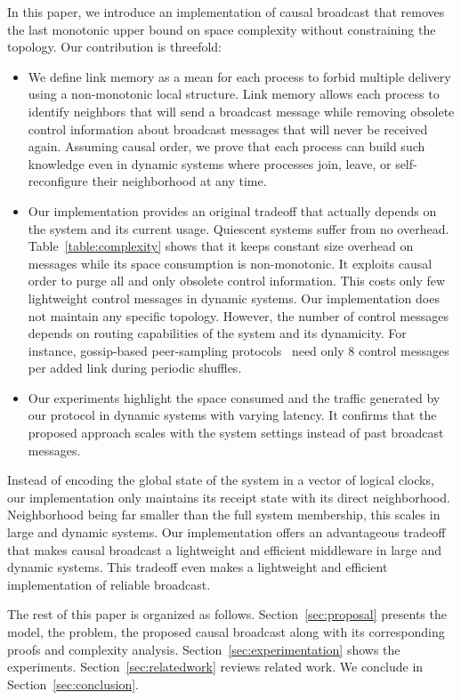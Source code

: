 In this paper, we introduce an implementation of causal broadcast that removes
the last monotonic upper bound on space complexity without constraining the
topology.  Our contribution is threefold:
\begin{itemize}[leftmargin=*]
\item We define link memory as a mean for each process to forbid multiple
  delivery using a non-monotonic local structure. Link memory allows each
  process to identify neighbors that will send a broadcast message while
  removing obsolete control information about broadcast messages that will never
  be received again. Assuming causal order, we prove that each process can build
  such knowledge even in dynamic systems where processes join, leave, or
  self-reconfigure their neighborhood at any time.
\item Our implementation provides an original tradeoff that actually depends on
  the system and its current usage. Quiescent systems suffer from no
  overhead. Table~\ref{table:complexity} shows that it keeps constant size
  overhead on messages while its space consumption is non-monotonic. It exploits
  causal order to purge all and only obsolete control information. This costs
  only few lightweight control messages in dynamic systems.  Our implementation
  does not maintain any specific topology. However, the number of control
  messages depends on routing capabilities of the system and its dynamicity. For
  instance, gossip-based peer-sampling
  protocols~\cite{jelasity2007gossip,jelasity2009tman,nedelec2017adaptive} need
  only 8 control messages per added link during periodic shuffles.
\item Our experiments highlight the space consumed and the traffic generated by
  our protocol in dynamic systems with varying latency. It confirms that the
  proposed approach scales with the system settings instead of past broadcast
  messages.
\end{itemize}
Instead of encoding the global state of the system in a vector of logical
clocks, our implementation only maintains its receipt state with its direct
neighborhood. Neighborhood being far smaller than the full system membership,
this scales in large and dynamic systems.  Our implementation offers an
advantageous tradeoff that makes causal broadcast a lightweight and efficient
middleware in large and dynamic systems. This tradeoff even makes a lightweight
and efficient implementation of reliable broadcast.

The rest of this paper is organized as follows. 
Section~\ref{sec:proposal} presents the model, the problem, the proposed causal
broadcast along with its corresponding proofs and complexity
analysis. Section~\ref{sec:experimentation} shows the
experiments. Section~\ref{sec:relatedwork} reviews related work. We conclude in
Section~\ref{sec:conclusion}.


